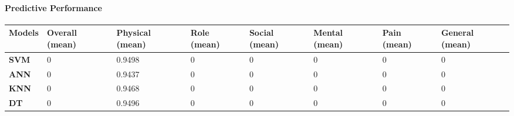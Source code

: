 \documentclass[runningheads]{llncs}
\begin{document}
\paragraph{Predictive Performance}
%
%
\begin{table}[h]
\begin{tabular}{|C{2cm}|C{1.5cm}|C{1.5cm}|C{1.5cm}|C{1.5cm}|C{1.5cm}|C{1.5cm}|C{1.5cm}|}
\hline
{} 
{\color[HTML]{333333} \textbf{Models}} & {\color[HTML]{333333} \textbf{Overall (mean)}} & {\color[HTML]{333333} \textbf{Physical (mean)}} & {\color[HTML]{333333} \textbf{Role (mean)}} &{\color[HTML]{333333} \textbf{Social (mean)}} & {\color[HTML]{333333} \textbf{Mental (mean)}} & {\color[HTML]{333333} \textbf{Pain (mean)}} & {\color[HTML]{333333} \textbf{General (mean)}} \\ \hline
{} 
\textbf{SVM}                           & 0                                       & 0.9498                                        & 0                                                          & 0                                                            & 0                                                            & 0                                                          & 0                                      \\ \hline
{} 
\textbf{ANN}                           & 0                                       & 0.9437                                        & 0                                                          & 0                                                            & 0                                                            & 0                                                          & 0                                      \\ \hline
{} 
\textbf{KNN}                           & 0                                       & 0.9468                                        & 0                                                          & 0                                                            & 0                                                            & 0                                                          & 0                                      \\ \hline
{} 
\textbf{DT}                            & 0                                       & 0.9496                                        & 0                                                          & 0                                                            & 0                                                            & 0                                                          & 0                                      \\ \hline

\end{tabular}
\end{table}
\end{document}
